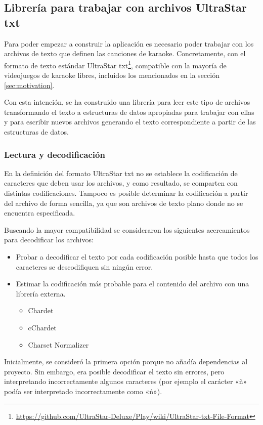\subsection{Librería para trabajar con archivos UltraStar txt}
\label{sec:txtparser}

Para poder empezar a construir la aplicación es necesario poder trabajar con los archivos de texto que definen las canciones de karaoke. Concretamente, con el formato de texto estándar UltraStar txt\footnote{\url{https://github.com/UltraStar-Deluxe/Play/wiki/UltraStar-txt-File-Format}},  compatible con la mayoría de videojuegos de karaoke libres, incluidos los mencionados en la sección \ref{sec:motivation}.

Con esta intención, se ha construido una librería para leer este tipo de archivos transformando el texto a estructuras de datos apropiadas para trabajar con ellas y para escribir nuevos archivos generando el texto correspondiente a partir de las estructuras de datos.

\subsubsection{Lectura y decodificación}

En la definición del formato UltraStar txt no se establece la codificación de caracteres que deben usar los archivos, y como resultado, se comparten con distintas codificaciones. Tampoco es posible determinar la codificación a partir del archivo de forma sencilla, ya que son archivos de texto plano donde no se encuentra especificada.

Buscando la mayor compatibilidad se consideraron los siguientes acercamientos para decodificar los archivos:

\begin{itemize}
	\item{Probar a decodificar el texto por cada codificación posible hasta que todos los caracteres se descodifiquen sin ningún error.}
	\item{Estimar la codificación más probable para el contenido del archivo con una librería externa.}
	\begin{itemize}
		\item{Chardet}
		\item{cChardet}
		\item{Charset Normalizer}
	\end{itemize}
\end{itemize}

Inicialmente, se consideró la primera opción porque no añadía dependencias al proyecto. Sin embargo, era posible decodificar el texto sin errores, pero interpretando incorrectamente algunos caracteres (por ejemplo el carácter «ñ» podía ser interpretado incorrectamente como «ń»).

